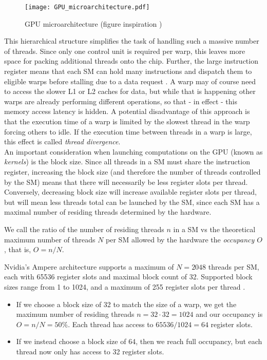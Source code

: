 \begin{figure}[ht]
    \centering
    \texttt{[image: GPU\_microarchitecture.pdf]}
    \caption{GPU microarchitecture (figure inspiration \cite*{solvercomp})}
    \label{fig:gpu}
\end{figure}

This hierarchical structure simplifies the task of handling such a massive number of 
threads. Since only one control unit is required per warp, this leaves more space for 
packing additional threads onto the chip. Further, the large instruction register means 
that each SM can hold many instructions and dispatch them to eligible warps before 
stalling due to a data request \cite*{solvercomp}. A warp may of course need to access 
the slower L1 or L2 caches for data, but while that is happening other warps are already 
performing different operations, so that - in effect - this memory access latency is 
hidden. A potential disadvantage of this approach is that the execution time of a warp 
is limited by the slowest thread in the warp forcing others to idle. If the execution 
time between threads in a warp is large, this effect is called \emph{thread divergence}. \\

An important consideration when launching computations on the GPU (known as \emph{kernels}) 
is the block size. Since all threads in a SM must share the instruction register, 
increasing the block size (and therefore the number of threads controlled by the SM) means 
that there will necessarily be less register slots per thread. Conversely, decreasing 
block size will increase available register slots per thread, but will mean less threads 
total can be launched by the SM, since each SM has a maximal number of residing threads 
determined by the hardware. 

\begin{definition}
    \cite*{occupancy, solvercomp} We call the ratio of the number of residing threads $n$ 
    in a SM vs the theoretical maximum number of threads $N$ per SM allowed by the hardware 
    the \emph{occupancy $O$}, that is, $O = n / N$.
\end{definition}

\begin{example}
    Nvidia's Ampere architecture supports a maximum of $N = 2048$ threads per SM, each with 
    65536 register slots and maximal block count of 32. Supported block sizes range from 1 
    to 1024, and a maximum of 255 register slots per thread \cite*{ampere}. 

    \begin{itemize} 
        \item If we choose a block size of 32 to match the size of a warp, we get the 
        maximum number of residing threads $n = 32 \cdot 32 = 1024$ and our occupancy is 
        $O = n / N = 50\%$. Each thread has access to $65536 / 1024 = 64$ register slots. 
        \item If we instead choose a block size of 64, then we reach full occupancy, but 
        each thread now only has access to 32 register slots. 
    \end{itemize}

\end{example}

